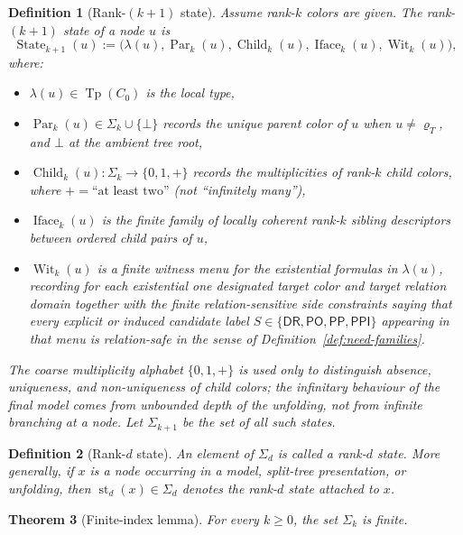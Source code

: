 \documentclass[11pt]{article}
\newtheorem{definition}{Definition}[section]
\newtheorem{theorem}[definition]{Theorem}
\theoremstyle{remark}
\newcommand{\DR}{\mathsf{DR}}
\newcommand{\PO}{\mathsf{PO}}
\newcommand{\PP}{\mathsf{PP}}
\newcommand{\PPI}{\mathsf{PPI}}
\newcommand{\RCC}{\{\DR,\PO,\PP,\PPI\}}
\newcommand{\Tp}{\operatorname{Tp}}
\newcommand{\State}{\operatorname{State}}
\newcommand{\Child}{\operatorname{Child}}
\newcommand{\Iface}{\operatorname{Iface}}
\newcommand{\Wit}{\operatorname{Wit}}
\newcommand{\Par}{\operatorname{Par}}
\newcommand{\st}{\operatorname{st}}
\begin{document}
\begin{definition}[Rank-$(k+1)$ state]\label{def:rank-k-plus-one-state}
Assume rank-$k$ colors are given. The rank-$(k+1)$ state of a node $u$ is
\[
\State_{k+1}(u):=\bigl(\lambda(u),\Par_k(u),\Child_k(u),\Iface_k(u),\Wit_k(u)\bigr),
\]
where:
\begin{itemize}
    \item $\lambda(u)\in\Tp(C_0)$ is the local type,
    \item $\Par_k(u)\in\Sigma_k\cup\{\bot\}$ records the unique parent color of $u$ when $u\neq \varrho_T$, and $\bot$ at the ambient tree root,
    \item $\Child_k(u):\Sigma_k\to\{0,1,+\}$ records the multiplicities of rank-$k$ child colors, where $+=\text{``at least two''}$ (not ``infinitely many''),
    \item $\Iface_k(u)$ is the finite family of locally coherent rank-$k$ sibling descriptors between ordered child pairs of $u$,
    \item $\Wit_k(u)$ is a finite witness menu for the existential formulas in $\lambda(u)$, recording for each existential one designated target color and target relation domain together with the finite relation-sensitive side constraints saying that every explicit or induced candidate label $S\in\RCC$ appearing in that menu is relation-safe in the sense of Definition~\ref{def:need-families}.
\end{itemize}
The coarse multiplicity alphabet $\{0,1,+\}$ is used only to distinguish absence, uniqueness, and non-uniqueness of child colors; the infinitary behaviour of the final model comes from unbounded depth of the unfolding, not from infinite branching at a node. Let $\Sigma_{k+1}$ be the set of all such states.
\end{definition}

\begin{definition}[Rank-$d$ state]
An element of $\Sigma_d$ is called a \emph{rank-$d$ state}. More generally, if $x$ is a node occurring in a model, split-tree presentation, or unfolding, then $\st_d(x)\in\Sigma_d$ denotes the rank-$d$ state attached to $x$.
\end{definition}

\begin{theorem}[Finite-index lemma]\label{thm:finite-index-completed}
For every $k\ge 0$, the set $\Sigma_k$ is finite.
\end{theorem}
\end{document}
